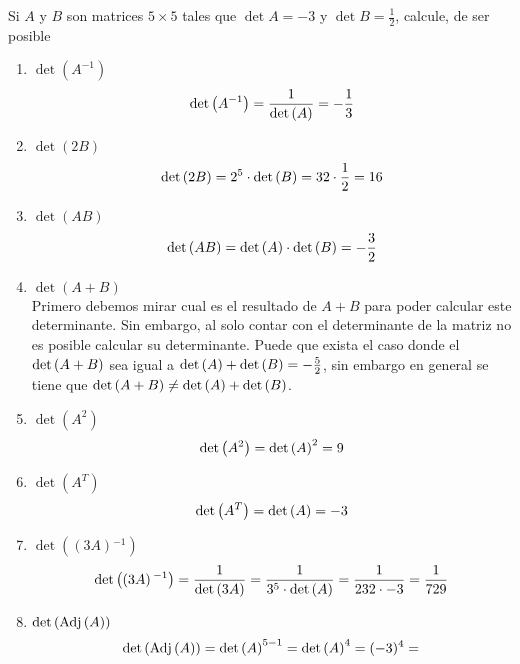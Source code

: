 \item Si \(A\) y \(B\) son matrices \(5 \times 5\) tales que \(\det A = −3\) y \(\det B = \frac{1}{2}\), calcule, de ser posible
    \begin{enumerate}[label=\listAlph]
        \item \(\det\left(A^{-1}\right)\)
            \[
                \text{det} \left( A^{-1} \right) 
                = \frac{1}{\text{det} \left( A \right)}
                = -\frac{1}{3}
            \]
        \item \(\det\left(2B\right)\)
            \[
                \text{det} \left( 2B \right) 
                = 2^5 \cdot \text{det} \left( B \right)
                = 32 \cdot \frac{1}{2}
                = 16
            \]
        \item \(\det\left(AB\right)\)
            \[
                \text{det} \left( AB \right)
                =
                \text{det} \left( A \right) \cdot \text{det} \left( B \right)
                = 
                -\frac{3}{2}
            \]
        \item \(\det\left(A + B\right)\) \\
            Primero debemos mirar cual es el resultado de \(A + B\) para poder calcular este determinante. 
            Sin embargo, al solo contar con el determinante de la matriz no es posible calcular su determinante.
            Puede que exista el caso donde el \(\text{det} \left( A+B \right)\) sea igual a \(\text{det} \left( A \right) + \text{det} \left( B \right) = -\frac{5}{2}\),
            sin embargo en general se tiene que \(\text{det} \left( A + B \right) \neq \text{det} \left( A \right) + \text{det} \left( B \right)\).
        \item \(\det\left(A^2\right)\)
            \[
                \text{det} \left( A^2 \right)
                =
                \text{det} \left( A \right)^2
                =
                9
            \]
        \item \(\det\left(A^T\right)\)
            \[
                \text{det} \left( A^T \right)
                =
                \text{det} \left( A \right)
                =
                -3
            \]
        \item \(\det\left(\left(3A\right){}^{-1}\right)\)
            \[
                \text{det} \left( \left(3A\right){}^{-1} \right)
                =
                \frac{1}{\text{det} \left( 3A \right)}
                =
                \frac{1}{3^5 \cdot \text{det} \left( A \right)}
                =
                \frac{1}{232 \cdot -3}
                =
                \frac{1}{729}
            \]
        \item \(\det\left(\text{Adj}\left(A\right)\right)\)
            \[
                \text{det} \left( \text{Adj} \left( A \right) \right)
                =
                \text{det} \left( A \right)^{5 - 1}
                =
                \text{det} \left( A \right)^{4}
                =
                (-3)^{4}
                =
\]
\end{enumerate}
